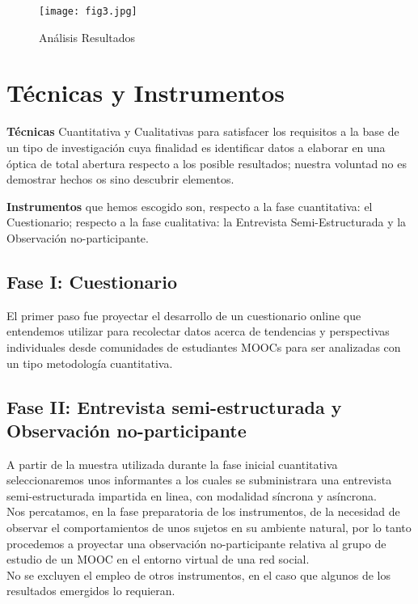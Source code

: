 \documentclass[10pt]{article}
\begin{document}
\begin{description}
\vspace{10pt}

\begin{figure}[ht]\centering
\texttt{[image: fig3.jpg]}
\caption{Análisis Resultados}
\label{fig:fig3.jpg}
\end{figure}

\section{Técnicas y Instrumentos}

\item \textbf{Técnicas} Cuantitativa y Cualitativas para satisfacer los requisitos a la base de un tipo de investigación cuya finalidad es identificar datos a elaborar en una óptica de total abertura respecto a los posible resultados; nuestra voluntad no es demostrar hechos os sino descubrir elementos.  

\item \textbf{Instrumentos} que hemos escogido son, respecto a la fase cuantitativa: el Cuestionario; respecto a la fase cualitativa: la Entrevista Semi-Estructurada y la Observación no-participante.

\subsection{Fase I: Cuestionario}
El primer paso fue proyectar el desarrollo de un cuestionario online que entendemos utilizar para recolectar datos acerca de tendencias y perspectivas individuales desde comunidades de estudiantes MOOCs para ser analizadas con un tipo metodología cuantitativa. 

\subsection{Fase II: Entrevista semi-estructurada y Observación no-participante}
A partir de la muestra utilizada durante la fase inicial cuantitativa seleccionaremos unos informantes a los cuales se subministrara una entrevista semi-estructurada impartida en linea, con modalidad síncrona y asíncrona.
\\Nos percatamos, en la fase preparatoria de los instrumentos, de la necesidad de observar el comportamientos de unos sujetos en su ambiente natural, por lo tanto procedemos a proyectar una observación no-participante relativa al grupo de estudio de un MOOC en el entorno virtual de una red social.
\\No se excluyen el empleo de otros instrumentos, en el caso que algunos de los resultados emergidos lo requieran. 


\end{description}
\end{document}
